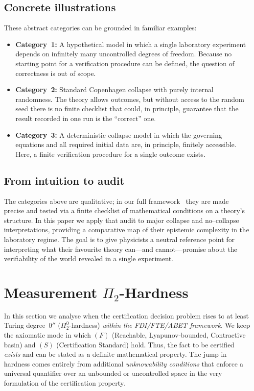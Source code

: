 \documentclass[12pt]{article}
\theoremstyle{definition}
\theoremstyle{plain}
\begin{document}
\subsection{Concrete illustrations}
These abstract categories can be grounded in familiar examples:
\begin{itemize}
  \item \textbf{Category~1:} A hypothetical model in which a single laboratory experiment  
  depends on infinitely many uncontrolled degrees of freedom.  
  Because no starting point for a verification procedure can be defined,  
  the question of correctness is out of scope.
  \item \textbf{Category~2:} Standard Copenhagen collapse with purely internal randomness.  
  The theory allows outcomes, but without access to the random seed there is no  
  finite checklist that could, in principle, guarantee that the result recorded  
  in one run is the ``correct'' one.
  \item \textbf{Category~3:} A deterministic collapse model in which the governing  
  equations and all required initial data are, in principle, finitely accessible.  
  Here, a finite verification procedure for a single outcome exists.
\end{itemize}

\subsection{From intuition to audit}
The categories above are qualitative; in our full framework~\cite{FullTheory2025}  
they are made precise and tested via a finite checklist of mathematical  
conditions on a theory's structure.  
In this paper we apply that audit to major collapse and no--collapse interpretations,  
providing a comparative map of their epistemic complexity in the laboratory regime.  
The goal is to give physicists a neutral reference point for interpreting  
what their favourite theory can---and cannot---promise about  
the verifiability of the world revealed in a single experiment.


\section{Measurement \texorpdfstring{$\Pi_2$}{Pi2}-Hardness}
\label{sec:pi2-hardness}

In this section we analyse when the certification decision problem 
rises to at least Turing degree~$0''$ 
(\(\Pi^0_2\)-hardness) \emph{within the FDI/FTE/ABET framework}. 
We keep the axiomatic mode in which \((F)\) 
(Reachable, Lyapunov-bounded, Contractive basin) 
and \((S)\) (Certification Standard) hold. 
Thus, the fact to be certified \emph{exists} and can be stated 
as a definite mathematical property. 
The jump in hardness comes entirely from 
additional \emph{unknowability conditions} that enforce 
a universal quantifier over an unbounded or uncontrolled space 
in the very formulation of the certification property.
\end{document}
